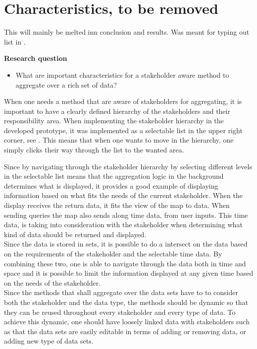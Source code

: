 
\section{Characteristics, to be removed} %
\label{sec:characteristics}
This will mainly be melted inn conclusion and results. Was meant for typing out
list in .

\textbf{Research question}
\begin{itemize}
	\item What are important characteristics for a stakeholder aware method to 
	aggregate over a rich set of data?
\end{itemize}

When one needs a method that are aware of stakeholders for aggregating, it is
important to have a clearly defined hierarchy of the stakeholders and their 
responsibility area. When implementing the stakeholder hierarchy in the
developed prototype, it was implemented as a selectable list in the upper right
corner, see . This means that when 
one wants to move in the hierarchy, one simply clicks their way through the list to the wanted area.


Since by navigating through the stakeholder hierarchy by selecting different
levels in the selectable list means that the aggregation logic in the 
background determines what is displayed, it provides a good example of
displaying information based on what fits the needs of the current stakeholder.
When the display receives the return data, it fits the view of the map to
data. When sending queries the map also sends along time data, from user 
inputs. This time data, is taking into consideration with the stakeholder when 
determining what kind of data should be returned and displayed.\\

Since the data is stored in sets, it is possible to do a intersect on the data
based on the requirements of the stakeholder and the selectable time data.
By combining these two, one is able to navigate through the  data both in time 
and space and it is possible to limit the information displayed at any given
time based on the needs of the stakeholder.\\


Since the methods that shall aggregate over the data sets have to to consider
both the stakeholder and the data type, the methods should be dynamic so that
they can be reused throughout every stakeholder and every type of data. To 
achieve this dynamic, one should have loosely linked data with stakeholders
such as that the data sets are easily editable in terms of adding or removing
data, or adding new type of data sets.

